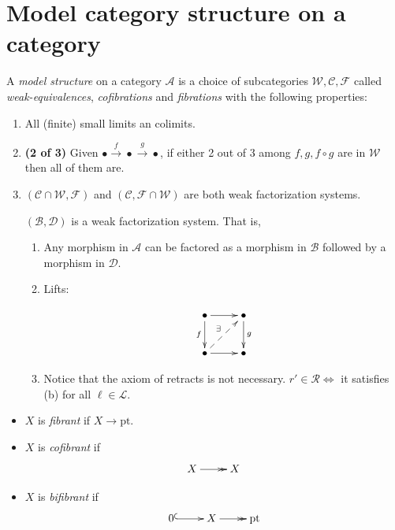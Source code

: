 \section{Model category structure on a
category}
\label{section-model-category-structure}

\begin{definition}[Lecture]
\label{definition-lecture}
A {\it model structure} on a category
$\mathcal{A}$
is a choice of subcategories
$\mathcal{W},\mathcal{C},\mathcal{F}$
called {\it weak-equivalences}, {\it
cofibrations} and {\it fibrations}
with the following properties:

\begin{enumerate}
\item[0.] All (finite) small limits an
colimits.

\item \textbf{(2 of 3)} Given
$\bullet\overset{f}{\to}\bullet\overset{g}
{\to}\bullet$,
if either 2 out of 3 among $f,g,f\circ g$
are in $\mathcal{W}$ then all of them are.

\item
$(\mathcal{C}\cap\mathcal{W},\mathcal{F})$
and
$(\mathcal{C},\mathcal{F}\cap\mathcal{W})$
are both weak factorization systems.

$(\mathcal{B},\mathcal{D})$ is a weak
factorization system. That is,

\begin{enumerate}
\item Any morphism in $\mathcal{A}$ can be
factored
as a morphism in $\mathcal{B}$
followed by a morphism in $\mathcal{D}$.

\item Lifts:

$$
\xymatrix{
\bullet\ar[d]_{f}\ar[r]&\bullet\ar[d]^{g}\\
\bullet\ar@{-->}[ur]^{\exists}\ar[r]&\bullet
}
$$

\item[(c')] Notice that the axiom of retracts
is not necessary. $r'\in\mathcal{R}\iff$ it
satisfies (b) for all $\ell\in\mathcal{L}$.
\end{enumerate}
\end{enumerate}
\end{definition}

\begin{definition}
\label{definition-item}
\begin{itemize}
\item $X$ is {\it fibrant} if
$X\to\text{pt}$.
\item $X$ is {\it cofibrant} if
$$
\xymatrix{
X\ar@{->>}[r]&X
}
$$
\item $X$ is {\it bifibrant} if
$$
\xymatrix{
0\ar@{^{(}->}[r]&X\ar@{->>}[r]&\text{pt}
}
$$
\end{itemize}
\end{definition}

